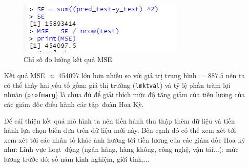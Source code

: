 \begin{figure}[H]
	\centering
	\includegraphics[width=.5\linewidth]{../Photo Of Result/B1_MSE.PNG}  
	\caption{Chỉ số đo lường kết quả MSE}
	\label{fig-b1:mse}
\end{figure}

Kết quả MSE $\approx$ 454097 lớn hơn nhiều so với giá trị trung bình $=887.5$ nên ta có thể thấy hai yếu tố gồm: giá thị trường (\texttt{lmktval}) và tỷ lệ phần trăm lợi nhuận (\texttt{profmarg}) là chưa đủ để giải thích mức độ tăng giảm của tiền lương của các giám đốc điều hành các tập~đoàn Hoa Kỳ. 

Để cải thiện kết quả mô hình ta nên tiến hành thu thập thêm dữ liệu và tiến hành lựa chọn biến dựa trên dữ liệu mới này. Bên cạnh đó có thể xem xét tới xem xét tới các nhân tố khác ảnh hưởng tới tiền lương của các giám đốc Hoa kỳ như: Lĩnh vực hoạt~động (ngân hàng, hàng không, công nghệ, vận tải...); mức lương trước đó; số năm kinh nghiệm, giới tính,...
	

